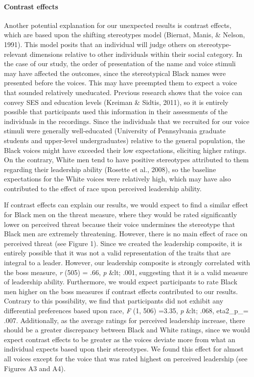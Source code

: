 \documentclass[
  english,
  man]{apa6}
\let\oldparagraph\paragraph
\renewcommand{\paragraph}[1]{\oldparagraph{#1}\mbox{}}
\begin{document}
\hypertarget{contrast-effects}{%
\paragraph{Contrast effects}\label{contrast-effects}}

Another potential explanation for our unexpected results is contrast effects, which are based upon the shifting stereotypes model (Biernat, Manis, \& Nelson, 1991). This model posits that an individual will judge others on stereotype-relevant dimensions relative to other individuals within their social category. In the case of our study, the order of presentation of the name and voice stimuli may have affected the outcomes, since the stereotypical Black names were presented before the voices. This may have preempted them to expect a voice that sounded relatively uneducated. Previous research shows that the voice can convey SES and education levels (Kreiman \& Sidtis, 2011), so it is entirely possible that participants used this information in their assessments of the individuals in the recordings. Since the individuals that we recruited for our voice stimuli were generally well-educated (University of Pennsylvania graduate students and upper-level undergraduates) relative to the general population, the Black voices might have exceeded their low expectations, eliciting higher ratings. On the contrary, White men tend to have positive stereotypes attributed to them regarding their leadership ability (Rosette et al., 2008), so the baseline expectations for the White voices were relatively high, which may have also contributed to the effect of race upon perceived leadership ability.

If contrast effects can explain our results, we would expect to find a similar effect for Black men on the threat measure, where they would be rated significantly lower on perceived threat because their voice undermines the stereotype that Black men are extremely threatening. However, there is no main effect of race on perceived threat (see Figure 1). Since we created the leadership composite, it is entirely possible that it was not a valid representation of the traits that are integral to a leader. However, our leadership composite is strongly correlated with the boss measure, \emph{r} (505) = .66, \emph{p} \&lt; .001, suggesting that it is a valid measure of leadership ability. Furthermore, we would expect participants to rate Black men higher on the boss measures if contrast effects contributed to our results. Contrary to this possibility, we find that participants did not exhibit any differential preferences based upon race, \emph{F} (1, 506) =3.35, \emph{p} \&lt; .068, eta2\_p\_= .007. Additionally, as the average ratings for perceived leadership increase, there should be a greater discrepancy between Black and White ratings, since we would expect contrast effects to be greater as the voices deviate more from what an individual expects based upon their stereotypes. We found this effect for almost all voices except for the voice that was rated highest on perceived leadership (see Figures A3 and A4).
\end{document}
